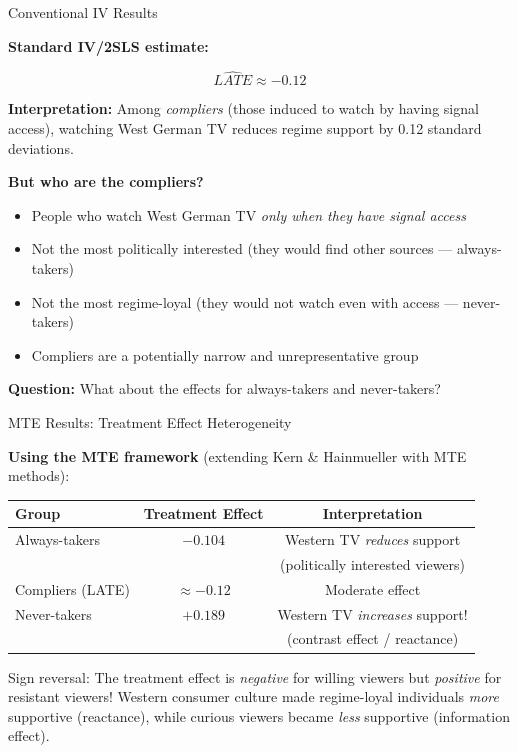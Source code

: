 \documentclass[aspectratio=169, handout]{beamer}
\numberwithin{equation}{section}
\begin{document}
\begin{frame}{Conventional IV Results}

\textbf{Standard IV/2SLS estimate:}

$$\widehat{LATE} \approx -0.12$$

\medskip
\textbf{Interpretation:} Among \textit{compliers} (those induced to watch by having signal access), watching West German TV reduces regime support by 0.12 standard deviations.

\medskip
\textbf{But who are the compliers?}
\begin{itemize}
\item People who watch West German TV \textit{only when they have signal access}
\item Not the most politically interested (they would find other sources --- always-takers)
\item Not the most regime-loyal (they would not watch even with access --- never-takers)
\item Compliers are a potentially \alert{narrow and unrepresentative} group
\end{itemize}

\medskip
\textbf{Question:} What about the effects for always-takers and never-takers?

\end{frame}

\begin{frame}{MTE Results: Treatment Effect Heterogeneity}

\textbf{Using the MTE framework} (extending Kern \& Hainmueller with MTE methods):

\medskip
\begin{table}[h]
\centering
\begin{tabular}{lcc}
\toprule
\textbf{Group} & \textbf{Treatment Effect} & \textbf{Interpretation} \\
\midrule
Always-takers & $-0.104$ & Western TV \textit{reduces} support \\
 & & (politically interested viewers) \\[6pt]
Compliers (LATE) & $\approx -0.12$ & Moderate effect \\[6pt]
Never-takers & $+0.189$ & Western TV \alert{\textit{increases}} support! \\
 & & (contrast effect / reactance) \\
\bottomrule
\end{tabular}
\end{table}

\smallskip
\alert{Sign reversal:} The treatment effect is \textit{negative} for willing viewers but \textit{positive} for resistant viewers! Western consumer culture made regime-loyal individuals \textit{more} supportive (reactance), while curious viewers became \textit{less} supportive (information effect).

\end{frame}
\end{document}
